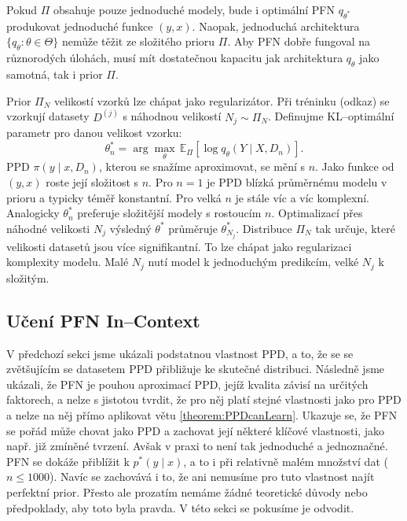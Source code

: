 Pokud $\Pi$ obsahuje pouze jednoduché modely, bude i optimální PFN $q_{\theta^*}$ produkovat jednoduché funkce $(y, x)$. 
Naopak, jednoduchá architektura $\{q_\theta : \theta \in \Theta\}$ nemůže těžit ze složitého prioru $\Pi$. 
Aby PFN dobře fungoval na různorodých úlohách, musí mít dostatečnou kapacitu jak architektura $q_\theta$ jako samotná, tak i prior $\Pi$.

Prior $\Pi_N$ velikostí vzorků lze chápat jako regularizátor.
Při tréninku (odkaz) se vzorkují datasety $D^{(j)}$ s náhodnou velikostí $N_j \sim \Pi_N$. 
Definujme KL–optimální parametr pro danou velikost vzorku:
$$\theta^*_n = \arg\max_{\theta} \, \mathbb{E}_\Pi[\log q_\theta(Y \mid X, D_n)].$$
PPD $\pi(y \mid x, D_n)$, kterou se snažíme aproximovat, se mění s $n$. 
Jako funkce od $(y, x)$ roste její složitost s $n$.
Pro $n = 1$ je PPD blízká průměrnému modelu v prioru a typicky téměř konstantní.
Pro velká $n$ je stále víc a víc komplexní. 
Analogicky $\theta^*_n$ preferuje složitější modely s rostoucím $n$.
Optimalizací přes náhodné velikosti $N_j$ výsledný $\theta^*$ průměruje $\theta^*_{N_j}$. 
Distribuce $\Pi_N$ tak určuje, které velikosti datasetů jsou více signifikantní. 
To lze chápat jako regularizaci komplexity modelu.
Malé $N_j$ nutí model k jednoduchým predikcím, velké $N_j$ k složitým.
\par 

\subsection{Učení PFN In–Context}
V předchozí sekci jsme ukázali podstatnou vlastnost PPD, a to, že se se zvětšujícím se datasetem PPD přibližuje ke skutečné distribuci.
Následně jsme ukázali, že PFN je pouhou aproximací PPD, jejíž kvalita závisí na určitých faktorech, a nelze s jistotou tvrdit, že pro něj platí stejné vlastnosti jako pro PPD a nelze na něj přímo aplikovat větu \ref{theorem:PPDcanLearn}.
Ukazuje se, že PFN se pořád může chovat jako PPD a zachovat její některé klíčové vlastnosti, jako např. již zmíněné tvrzení.
Avšak v praxi to není tak jednoduché a jednoznačné.
PFN se dokáže přiblížit k $p^*(y \mid x)$, a to i při relativně malém množství dat ($n \leq 1000$).
Navíc se zachovává i to, že ani nemusíme pro tuto vlastnost najít perfektní prior.
Přesto ale prozatím nemáme žádné teoretické důvody nebo předpoklady, aby toto byla pravda.
V této sekci se pokusíme je odvodit.
\par   

